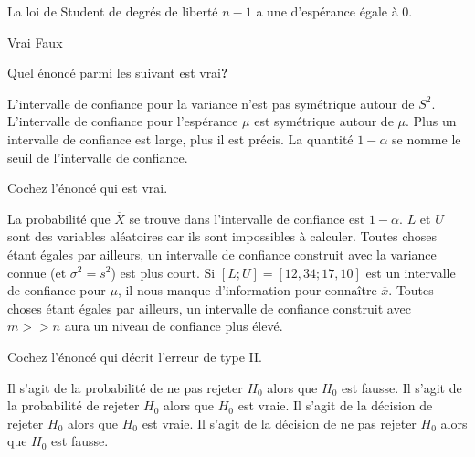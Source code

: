 \begin{questions}
\vspace{0.5cm}

\question[3] La loi de Student de degrés de liberté $n-1$ a une d'espérance égale à $0$.

\begin{oneparcheckboxes}
    \correctchoice Vrai 
    \choice Faux
\end{oneparcheckboxes}

\vspace{0.5cm}

\question[3] Quel énoncé parmi les suivant est vrai\textbf{?}

\begin{checkboxes}
    \correctchoice L'intervalle de confiance pour la variance n'est pas symétrique autour de $S^2$.
    \choice L'intervalle de confiance pour l'espérance $\mu$ est symétrique autour de $\mu$.
    \choice Plus un intervalle de confiance est large, plus il est précis.
    \choice La quantité $1-\alpha$ se nomme le seuil de l'intervalle de confiance.
\end{checkboxes}

\pageblanche
\question[3] Cochez l'énoncé qui est vrai.

\begin{checkboxes}
    \choice La probabilité que $\overline{X}$ se trouve dans l'intervalle de confiance est $1-\alpha$.
    \choice $L$ et $U$ sont des variables aléatoires car ils sont impossibles à calculer.
    \correctchoice Toutes choses étant égales par ailleurs, un intervalle de confiance construit avec la variance connue (et $\sigma^2=s^2$) est plus court.
    \choice Si $[L;U]=[12,34;17,10]$ est un intervalle de confiance pour $\mu$, il nous manque d'information pour connaître $\overline{x}$.
    \choice Toutes choses étant égales par ailleurs, un intervalle de confiance construit avec $m>>n$ aura un niveau de confiance plus élevé.
\end{checkboxes}

\vspace{0.5cm}

\question[3] Cochez l'énoncé qui décrit l'erreur de type II.

\begin{checkboxes}
    \choice Il s'agit de la probabilité de ne pas rejeter $H_0$ alors que $H_0$ est fausse.
    \choice Il s'agit de la probabilité de  rejeter $H_0$ alors que $H_0$ est vraie.
    \choice Il s'agit de la décision de  rejeter $H_0$ alors que $H_0$ est vraie.
    \correctchoice Il s'agit de la décision de ne pas rejeter $H_0$ alors que $H_0$ est fausse.
\end{checkboxes}


\end{questions}
